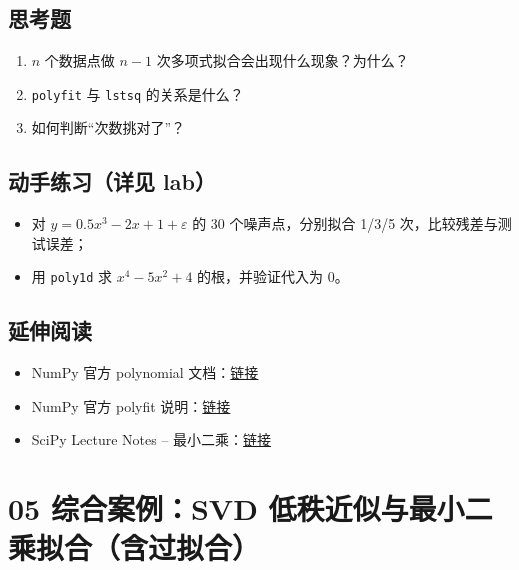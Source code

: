 \subsection{思考题}\label{ux601dux8003ux9898-6}

\begin{enumerate}
\def\labelenumi{\arabic{enumi}.}
\tightlist
\item
  \(n\) 个数据点做 \(n-1\) 次多项式拟合会出现什么现象？为什么？
\item
  \texttt{polyfit} 与 \texttt{lstsq} 的关系是什么？
\item
  如何判断``次数挑对了''？
\end{enumerate}

\subsection{动手练习（详见
lab）}\label{ux52a8ux624bux7ec3ux4e60ux8be6ux89c1-lab-3}

\begin{itemize}
\tightlist
\item
  对 \(y = 0.5x^3 - 2x + 1 + \varepsilon\) 的 30 个噪声点，分别拟合
  1/3/5 次，比较残差与测试误差；
\item
  用 \texttt{poly1d} 求 \(x^4 - 5x^2 + 4\) 的根，并验证代入为 0。
\end{itemize}

\subsection{延伸阅读}\label{ux5ef6ux4f38ux9605ux8bfb-3}

\begin{itemize}
\tightlist
\item
  NumPy 官方 polynomial
  文档：\href{https://numpy.org/doc/stable/reference/routines.polynomials.html}{链接}
\item
  NumPy 官方 polyfit
  说明：\href{https://numpy.org/doc/stable/reference/generated/numpy.polyfit.html}{链接}
\item
  SciPy Lecture Notes --
  最小二乘：\href{https://scipy-lectures.org/intro/scipy.html\#least-squares-approximation}{链接}
\end{itemize}

\section{05 综合案例：SVD
低秩近似与最小二乘拟合（含过拟合）}\label{ux7efcux5408ux6848ux4f8bsvd-ux4f4eux79e9ux8fd1ux4f3cux4e0eux6700ux5c0fux4e8cux4e58ux62dfux5408ux542bux8fc7ux62dfux5408}

